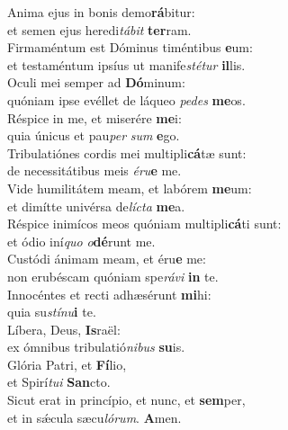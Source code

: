 \evenverse Anima ejus in bonis demo\textbf{rá}bitur:~\*\\
\evenverse et semen ejus heredi\textit{tá}\textit{bit} \textbf{ter}ram.\\
\oddverse Firmaméntum est Dóminus timéntibus \textbf{e}um:~\*\\
\oddverse et testaméntum ipsíus ut manife\textit{sté}\textit{tur} \textbf{il}lis.\\
\evenverse Oculi mei semper ad \textbf{Dó}minum:~\*\\
\evenverse quóniam ipse evéllet de láqueo \textit{pe}\textit{des} \textbf{me}os.\\
\oddverse Réspice in me, et miserére \textbf{me}i:~\*\\
\oddverse quia únicus et pau\textit{per} \textit{sum} \textbf{e}go.\\
\evenverse Tribulatiónes cordis mei multipli\textbf{cá}tæ sunt:~\*\\
\evenverse de necessitátibus meis \textit{é}\textit{ru}\textbf{e} me.\\
\oddverse Vide humilitátem meam, et labórem \textbf{me}um:~\*\\
\oddverse et dimítte univérsa de\textit{lí}\textit{cta} \textbf{me}a.\\
\evenverse Réspice inimícos meos quóniam multipli\textbf{cá}ti sunt:~\*\\
\evenverse et ódio iní\textit{quo} \textit{o}\textbf{dé}runt me.\\
\oddverse Custódi ánimam meam, et éru\textbf{e} me:~\*\\
\oddverse non erubéscam quóniam spe\textit{rá}\textit{vi} \textbf{in} te.\\
\evenverse Innocéntes et recti adhæsérunt \textbf{mi}hi:~\*\\
\evenverse quia su\textit{stí}\textit{nu}\textbf{i} te.\\
\oddverse Líbera, Deus, \textbf{Is}raël:~\*\\
\oddverse ex ómnibus tribulatió\textit{ni}\textit{bus} \textbf{su}is.\\
\evenverse Glória Patri, et \textbf{Fí}lio,~\*\\
\evenverse et Spirí\textit{tu}\textit{i} \textbf{San}cto.\\
\oddverse Sicut erat in princípio, et nunc, et \textbf{sem}per,~\*\\
\oddverse et in sǽcula sæcu\textit{ló}\textit{rum}. \textbf{A}men.\\
